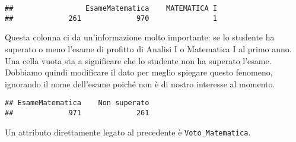 \documentclass[
]{article}
\newenvironment{Shaded}{\begin{snugshade}}{\end{snugshade}}
\newcommand{\KeywordTok}[1]{\textcolor[rgb]{0.13,0.29,0.53}{\textbf{#1}}}
\newcommand{\NormalTok}[1]{#1}
\newcommand{\OperatorTok}[1]{\textcolor[rgb]{0.81,0.36,0.00}{\textbf{#1}}}
\newcommand{\StringTok}[1]{\textcolor[rgb]{0.31,0.60,0.02}{#1}}
\begin{document}
\begin{verbatim}
##                 EsameMatematica    MATEMATICA I 
##             261             970               1
\end{verbatim}

Questa colonna ci da un'informazione molto importante: se lo studente ha
superato o meno l'esame di profitto di Analisi I o Matematica I al primo
anno. Una cella vuota sta a significare che lo studente non ha superato
l'esame. Dobbiamo quindi modificare il dato per meglio spiegare questo
fenomeno, ignorando il nome dell'esame poiché non è di nostro interesse
al momento.

\begin{Shaded}
\end{Shaded}

\begin{verbatim}
## EsameMatematica    Non superato 
##             971             261
\end{verbatim}

Un attributo direttamente legato al precedente è
\texttt{Voto\_Matematica}.

\begin{Shaded}
\end{Shaded}
\end{document}
